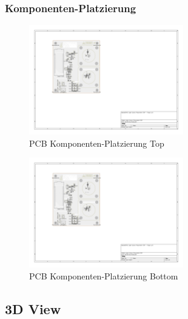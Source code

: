 \documentclass[11pt,a4paper,hidelinks]{article}
\begin{document}
\subsubsection{Komponenten-Platzierung}

\begin{figure}[H]
    \centering
    \includegraphics[page=1, trim=120 220 450 80, clip, width=0.6\textwidth]{attachments/pcb_placement.pdf}
    \caption{PCB Komponenten-Platzierung Top}\label{fig:pcb_placement_1}
\end{figure}

\begin{figure}[H]
    \centering
    \includegraphics[page=2, trim=450 220 120 80, clip, width=0.6\textwidth]{attachments/pcb_placement.pdf}
    \caption{PCB Komponenten-Platzierung Bottom}\label{fig:pcb_placement_2}
\end{figure}

\pagebreak

\subsection{3D View}
\end{document}
